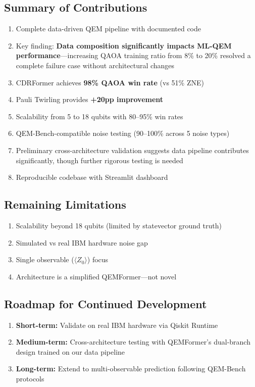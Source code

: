 \documentclass[11pt, a4paper]{article}
\begin{document}
\subsection{Summary of Contributions}

\begin{enumerate}
    \item Complete data-driven QEM pipeline with documented code
    \item Key finding: \textbf{Data composition significantly impacts
    ML-QEM performance}---increasing QAOA training ratio from 8\% to 20\%
    resolved a complete failure case without architectural changes
    \item CDRFormer achieves \textbf{98\% QAOA win rate} (vs 51\% ZNE)
    \item Pauli Twirling provides \textbf{+20pp improvement}
    \item Scalability from 5 to 18 qubits with 80--95\% win rates
    \item QEM-Bench-compatible noise testing (90--100\% across 5 noise types)
    \item Preliminary cross-architecture validation suggests data pipeline
    contributes significantly, though further rigorous testing is needed
    \item Reproducible codebase with Streamlit dashboard
\end{enumerate}

\subsection{Remaining Limitations}

\begin{enumerate}
    \item Scalability beyond 18 qubits (limited by statevector ground truth)
    \item Simulated vs real IBM hardware noise gap
    \item Single observable ($\langle Z_0 \rangle$) focus
    \item Architecture is a simplified QEMFormer---not novel
\end{enumerate}

\subsection{Roadmap for Continued Development}

\begin{enumerate}
    \item \textbf{Short-term:} Validate on real IBM hardware via Qiskit Runtime
    \item \textbf{Medium-term:} Cross-architecture testing with QEMFormer's
    dual-branch design trained on our data pipeline
    \item \textbf{Long-term:} Extend to multi-observable prediction following
    QEM-Bench protocols
\end{enumerate}
\end{document}

